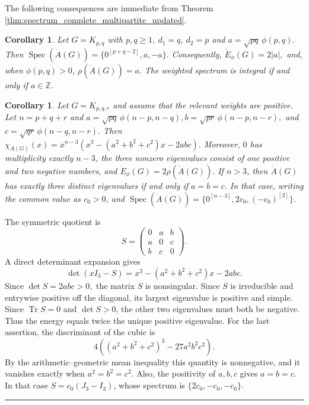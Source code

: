 \documentclass[12pt,twoside]{article}
\renewenvironment{proof}{{\noindent\bfseries Proof.}}{\qed}
\newcommand{\spec}{\operatorname{Spec}}
\newtheorem{corollary}[theorem]{Corollary}
\def\qed{\nolinebreak\hfill\rule{.2cm}{.2cm}\par\addvspace{.5cm}}
\begin{document}
The following consequences are immediate from Theorem \ref{thm:spectrum_complete_multipartite_updated}.
\begin{corollary}\label{cor:bipartite_weighted_spectrum}
	Let $G=K_{p,q}$ with $p,q\ge 1$, $d_1=q$, $d_2=p$ and
	$
	a=\sqrt{pq}\,\phi(p,q).
	$
	Then
	$
	\spec(\dot A(G))=\{0^{[p+q-2]},a,-a\}.
	$
	Consequently,
	$
	\dot E_\phi(G)=2|a|,
	$
	and, when $\phi(p,q)>0$,
	$
	\rho(\dot A(G))=a.
	$
	The weighted spectrum is integral if and only if $a\in\mathbb Z$.
\end{corollary}


\begin{corollary}\label{thm:tripartite_cubic_inertia}
	Let $G=K_{p,q,r}$ and assume that the relevant weights are positive. Let $n=p+q+r$ and
	$ a=\sqrt{pq}\,\phi(n-p,n-q),		b=\sqrt{pr}\,\phi(n-p,n-r),$ and $
		c=\sqrt{qr}\,\phi(n-q,n-r). $
	Then
	$
	\chi_{\dot A(G)}(x)
	=x^{n-3}\left(x^3-(a^2+b^2+c^2)x-2abc\right).
	$
	Moreover, $0$ has multiplicity exactly $n-3$, the three nonzero eigenvalues consist of one positive and two negative numbers, and
	$
	\dot E_\phi(G)=2\rho(\dot A(G)).
	$
	If $n>3$, then $\dot A(G)$ has exactly three distinct eigenvalues if and only if
	$
	a=b=c.
	$
	In that case, writing the common value as $c_0>0$, and
	$
	\spec(\dot A(G))=\{0^{[n-3]},2c_0,(-c_0)^{[2]}\}.
	$
\end{corollary}

\begin{proof}
	The symmetric quotient is
	$$
	S=\begin{pmatrix}
		0&a&b\\
		a&0&c\\
		b&c&0
	\end{pmatrix}.
	$$
	A direct determinant expansion gives
	$$
	\det(xI_3-S)=x^3-(a^2+b^2+c^2)x-2abc.
	$$
	Since
	$
	\det S=2abc>0,
	$
	the matrix $S$ is nonsingular. Since $S$ is irreducible and entrywise positive off the diagonal, its largest eigenvalue is positive and simple. Since $\operatorname{Tr}S=0$ and $\det S>0$, the other two eigenvalues must both be negative. Thus the energy equals twice the unique positive eigenvalue. For the last assertion, the discriminant of the cubic is
	$$
	4\left((a^2+b^2+c^2)^3-27a^2b^2c^2\right).
	$$
	By the arithmetic--geometric mean inequality this quantity is nonnegative, and it vanishes exactly when $a^2=b^2=c^2$. Also, the positivity of $a,b,c$  gives $a=b=c$. In that case $S=c_0(J_3-I_3)$, whose spectrum is $\{2c_0,-c_0,-c_0\}$.
\end{proof}
\end{document}
